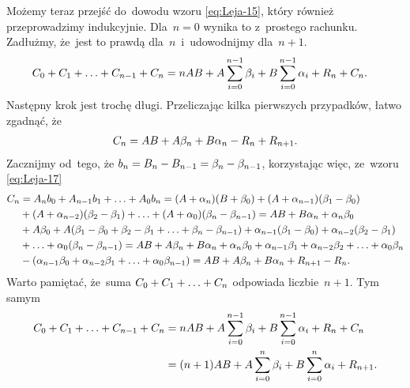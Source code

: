 \documentclass[a4paper,11pt]{article}
\begin{document}
Możemy teraz przejść do~dowodu wzoru \eqref{eq:Leja-15}, który również
przeprowadzimy indukcyjnie. Dla~$n = 0$ wynika to z~prostego rachunku.
Zadłużmy, że~jest to prawdą dla~$n$~i~udowodnijmy dla~$n + 1$.
\begin{equation}
  \label{eq:Leja-19}
  \begin{split}
    C_{ 0 } + C_{ 1 } + \ldots + C_{ n - 1 } + C_{ n } &= n AB + A \sum\limits_{
      i = 0 }^{ n - 1 } \beta_{ i } + B \sum\limits_{ i = 0 }^{ n - 1 } \alpha_{ i
    } + R_{ n } + C_{ n }.
  \end{split}
\end{equation}
Następny krok jest trochę długi. Przeliczając kilka pierwszych
przypadków, łatwo zgadnąć, że
\begin{equation}
  \label{eq:Leja-20}
  \begin{split}
    C_{ n } = AB + A \beta_{ n } + B \alpha_{ n } - R_{ n } + R_{ n + 1 }.
  \end{split}
\end{equation}
Zacznijmy od~tego, że
$b_{ n } = B_{ n } - B_{ n - 1 } = \beta_{ n } - \beta_{ n - 1 }$,
korzystając więc, ze~wzoru \eqref{eq:Leja-17}
\begin{equation}
  \label{eq:Leja-21}
  \begin{split}
    C_{ n } &= A_{ n } b_{ 0 } + A_{ n - 1 } b_{ 1 } + \ldots + A_{ 0 }
    b_{ n } = ( A + \alpha_{ n } ) ( B + \beta_{ 0 } ) + ( A + \alpha_{ n - 1
    } )
    ( \beta_{ 1 } - \beta_{ 0 } ) \\
    &+ ( A + \alpha_{ n - 2 } )( \beta_{ 2 } - \beta_{ 1 } ) + \ldots + ( A +
    \alpha_{ 0 } ) ( \beta_{ n } - \beta_{ n - 1 } )
    = AB + B \alpha_{ n } + \alpha_{ n } \beta_{ 0 } \\
    &+ A \beta_{ 0 } + A ( \beta_{ 1 } - \beta_{ 0 } + \beta_{ 2 } - \beta_{ 1 }
    + \ldots + \beta_{ n } - \beta_{ n - 1 } ) + \alpha_{ n - 1 } ( \beta_{ 1 } -
    \beta_{ 0 } )
    + \alpha_{ n - 2 } ( \beta_{ 2 } - \beta_{ 1 } ) \\
    & + \ldots + \alpha_{ 0 } ( \beta_{ n } - \beta_{ n - 1 } ) = AB + A \beta_{ n
    } + B \alpha_{ n } + \alpha_{ n } \beta_{ 0 } + \alpha_{ n - 1 } \beta_{ 1 } +
    \alpha_{ n - 2 } \beta_{ 2 } + \ldots + \alpha_{ 0 } \beta_{ n } \\
    & - ( \alpha_{ n - 1 } \beta_{ 0 } + \alpha_{ n - 2 } \beta_{ 1 } + \ldots +
    \alpha_{ 0 } \beta_{ n - 1 } ) = AB + A \beta_{ n } + B \alpha_{ n } + R_{ n
      + 1 } - R_{ n }.
  \end{split}
\end{equation}
Warto pamiętać, że~suma $C_{ 0 } + C_{ 1 } + \ldots + C_{ n }$ odpowiada
liczbie~$n + 1$. Tym samym
\begin{equation}
  \label{eq:Leja-22}
  \begin{split}
    C_{ 0 } + C_{ 1 } + \ldots + C_{ n - 1 } + C_{ n } &= n AB + A \sum\limits_{
      i = 0 }^{ n - 1 } \beta_{ i } + B \sum\limits_{ i = 0 }^{ n - 1 } \alpha_{ i
    } + R_{ n } + C_{ n } \\
    &= ( n + 1 ) AB + A \sum\limits_{ i = 0 }^{ n } \beta_{ i } + B \sum\limits_{ i =
      0 }^{ n } \alpha_{ i } + R_{ n + 1 }.
  \end{split}
\end{equation}
\end{document}
